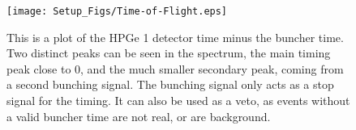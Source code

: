 \begin{figure}[hbt!]
    \centering
    \texttt{[image: Setup\_Figs/Time-of-Flight.eps]}
    \caption{This is a plot of the HPGe 1 detector time minus the buncher time. Two distinct peaks can be seen in the spectrum, the main timing peak close to 0, and the much smaller secondary peak, coming from a second bunching signal. The bunching signal only acts as a stop signal for the timing. It can also be used as a veto, as events without a valid buncher time are not real, or are background.}
    \label{fig:bunched}
\end{figure}